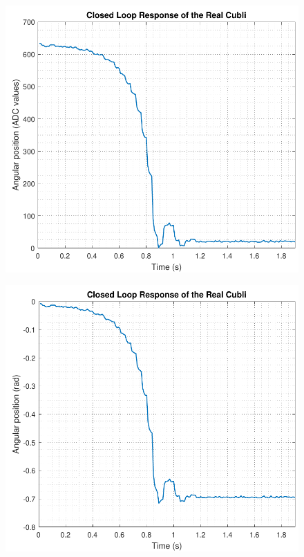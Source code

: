 \begin{minipage}{0.45\linewidth}
	\begin{figure}[H]
		\includegraphics[scale=.53]{figures/ADCTestTustinPre}
		\captionsetup{justification=centering}
		\label{ADCTestTustinPre}
	\end{figure}\vspace{-5mm}
\end{minipage}
\hspace{0.03\linewidth}
\begin{minipage}{0.45\linewidth}
	\begin{figure}[H]\vspace{-4mm}
		\includegraphics[scale=.53]{figures/positionTestTustinPre}
		\captionsetup{justification=centering}
		\label{positionTestTustinPre}
	\end{figure}\vspace{-5mm}
\end{minipage}

